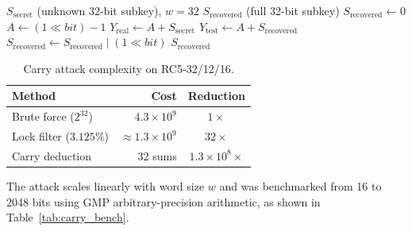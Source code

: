 \documentclass{sbc2023-pdf}%
\theoremstyle{plain}
\begin{document}
\begin{algorithm}[htbp]
\caption{Carry-based subkey recovery for RC5}
\label{alg:rc5_carry}
\begin{algorithmic}[1]
\REQUIRE \(S_{\text{secret}}\) (unknown 32-bit subkey), \(w = 32\)
\ENSURE \(S_{\text{recovered}}\) (full 32-bit subkey)
\STATE \(S_{\text{recovered}} \gets 0\)
    \STATE \(A \gets (1 \ll bit) - 1\) 
    \STATE \(Y_{\text{real}} \gets A + S_{\text{secret}}\)
    \STATE \(Y_{\text{test}} \gets A + S_{\text{recovered}}\)
        \STATE \(S_{\text{recovered}} \gets S_{\text{recovered}} \mid (1 \ll bit)\)
    \ENDIF
\ENDFOR
\RETURN \(S_{\text{recovered}}\)
\end{algorithmic}
\end{algorithm}

\begin{table}[htbp]
\centering
\caption{Carry attack complexity on RC5-32/12/16.}
\label{tab:carry}
\begin{tabular}{lrc}
\toprule
Method & Cost & Reduction \\
\midrule
Brute force (\(2^{32}\)) & \(4.3\times10^9\) & \(1\times\) \\
Lock filter (\(3.125\%\)) & \(\approx 1.3\times10^9\) & \(32\times\) \\
Carry deduction & 32 sums & \(1.3\times10^8\times\) \\
\bottomrule
\end{tabular}
\end{table}

The attack scales linearly with word size \(w\) and was benchmarked from 16 to 2048 bits using GMP arbitrary-precision arithmetic, as shown in Table~\ref{tab:carry_bench}.

\begin{table}[htbp]
\centering
\caption{Carry attack benchmark for various word sizes (GMP).}
\label{tab:carry_bench}
\end{table}
\end{document}

